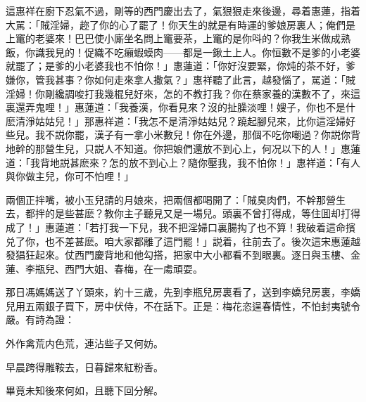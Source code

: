 這惠祥在廚下忍氣不過，剛等的西門慶出去了，氣狠狠走來後邊，尋着惠蓮，指着大駡：「賊淫婦，趂了你的心了罷了！你天生的就是有時運的爹娘房裏人；俺們是上竃的老婆來！巴巴使小廝坐名問上竃要茶，上竃的是你呌的？你我生米做成熟飯，你識我見的！促織不吃癩蝦蟆肉——都是一鍬土上人。你恒數不是爹的小老婆就罷了；是爹的小老婆我也不怕你！」惠蓮道：「你好沒要緊，你炖的茶不好，爹嫌你，管我甚事？你如何走來拿人撒氣？」惠祥聽了此言，越發惱了，駡道：「賊淫婦！你剛纔調唆打我幾棍兒好來，怎的不教打我？你在蔡家養的漢數不了，來這裏還弄鬼哩！」惠蓮道：「我養漢，你看見來？沒的扯臊淡哩！嫂子，你也不是什麽清淨姑姑兒！」那惠祥道：「我怎不是清淨姑姑兒？蹺起腳兒來，比你這淫婦好些兒。我不説你罷，漢子有一拿小米數兒！你在外邊，那個不吃你嘲過？你説你背地幹的那營生兒，只説人不知道。你把娘們還放不到心上，何况以下的人！」惠蓮道：「我背地説甚麽來？怎的放不到心上？隨你壓我，我不怕你！」惠祥道：「有人與你做主兒，你可不怕哩！」

兩個正拌嘴，被小玉兒請的月娘來，把兩個都喝開了：「賊臭肉們，不幹那營生去，都拌的是些甚麽？教你主子聽見又是一場兒。頭裏不曾打得成，等住囬却打得成了！」惠蓮道：「若打我一下兒，我不把淫婦口裏腸抅了也不算！我破着這命擯兑了你，也不差甚麽。咱大家都離了這門罷！」説着，往前去了。後次這宋惠蓮越發猖狂起來。仗西門慶背地和他勾搭，把家中大小都看不到眼裏。逐日與玉樓、金蓮、李瓶兒、西門大姐、春梅，在一䖏頑耍。

那日馮媽媽送了丫頭來，約十三歲，先到李瓶兒房裏看了，送到李嬌兒房裏，李嬌兒用五兩銀子買下，房中伏侍，不在話下。正是：梅花恣逞春情性，不怕封夷號令嚴。有詩為證：

\begin{myquote}
外作禽荒内色荒，連沾些子又何妨。

早晨跨得雕鞍去，日暮歸來紅粉香。
\end{myquote}

畢竟未知後來何如，且聽下回分解。

